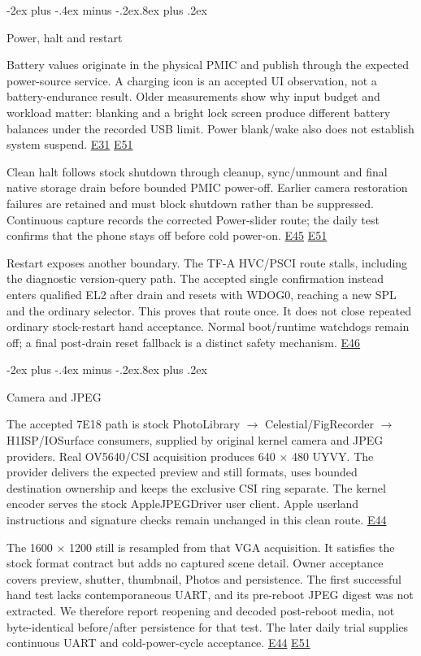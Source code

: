 \documentclass[10pt,letterpaper,twocolumn]{article}
\makeatletter
\renewcommand{\subsection}{\@startsection{subsection}{2}{0pt}
  {-2ex plus -.4ex minus -.2ex}{.8ex plus .2ex}
  {\normalfont\normalsize\bfseries\raggedright}}
\makeatother
\begin{document}
\subsection{Power, halt and restart}

Battery values originate in the physical PMIC and publish through the expected power-source service. A charging icon is an accepted UI observation, not a battery-endurance result. Older measurements show why input budget and workload matter: blanking and a bright lock screen produce different battery balances under the recorded USB limit. Power blank/wake also does not establish system suspend. \hyperlink{e-E31}{\textsf{E31}} \hyperlink{e-E51}{\textsf{E51}}

Clean halt follows stock shutdown through cleanup, sync/unmount and final native storage drain before bounded PMIC power-off. Earlier camera restoration failures are retained and must block shutdown rather than be suppressed. Continuous capture records the corrected Power-slider route; the daily test confirms that the phone stays off before cold power-on. \hyperlink{e-E45}{\textsf{E45}} \hyperlink{e-E51}{\textsf{E51}}

Restart exposes another boundary. The TF-A HVC/PSCI route stalls, including the diagnostic version-query path. The accepted single confirmation instead enters qualified EL2 after drain and resets with WDOG0, reaching a new SPL and the ordinary selector. This proves that route once. It does not close repeated ordinary stock-restart hand acceptance. Normal boot/runtime watchdogs remain off; a final post-drain reset fallback is a distinct safety mechanism. \hyperlink{e-E46}{\textsf{E46}}

\subsection{Camera and JPEG}

The accepted 7E18 path is stock PhotoLibrary \(\rightarrow\) Celestial/FigRecorder \(\rightarrow\) H1ISP/IOSurface consumers, supplied by original kernel camera and JPEG providers. Real OV5640/CSI acquisition produces 640 \(\times\) 480 UYVY. The provider delivers the expected preview and still formats, uses bounded destination ownership and keeps the exclusive CSI ring separate. The kernel encoder serves the stock AppleJPEGDriver user client. Apple userland instructions and signature checks remain unchanged in this clean route. \hyperlink{e-E44}{\textsf{E44}}

The 1600 \(\times\) 1200 still is resampled from that VGA acquisition. It satisfies the stock format contract but adds no captured scene detail. Owner acceptance covers preview, shutter, thumbnail, Photos and persistence. The first successful hand test lacks contemporaneous UART, and its pre-reboot JPEG digest was not extracted. We therefore report reopening and decoded post-reboot media, not byte-identical before/after persistence for that test. The later daily trial supplies continuous UART and cold-power-cycle acceptance. \hyperlink{e-E44}{\textsf{E44}} \hyperlink{e-E51}{\textsf{E51}}
\end{document}
